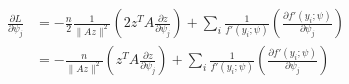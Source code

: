 \documentclass[10pt]{article}
\begin{document}
\begin{align*}\begin{split}
\frac{\partial L}{\partial \psi_j} &= 
-\frac{n}{2} \frac{1}{\lVert A z \rVert^2} \left( 2 z^T A \frac{\partial z}{\partial \psi_j} \right) +
\sum_i \frac{1}{f'\left(y_i;\psi\right)} \left(\frac{\partial f'\left(y_i;\psi\right)}{\partial \psi_j}\right) \\
&= -\frac{n}{\lVert A z \rVert^2}\left(z^T A \frac{\partial z}{\partial \psi_j}\right) +
\sum_i \frac{1}{f'\left(y_i;\psi\right)} \left(\frac{\partial f'\left(y_i;\psi\right)}{\partial \psi_j}\right) \\
\end{split}\end{align*}
\end{document}
